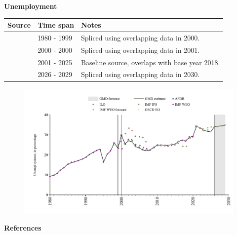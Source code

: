 \documentclass[12pt,a4paper,landscape]{article}
\begin{document}
\begin{adjustbox}{max totalsize={\paperwidth}{\paperheight},center}
\begin{minipage}[t][\textheight][t]{\textwidth}
\vspace*{0.5cm}
{}
\begin{center}
{\Large\bfseries Unemployment}
\end{center}
\vspace{0.5cm}
\begin{table}[H]
\centering
\small
\begin{tabular}{|l|l|l|}
\hline
\textbf{Source} & \textbf{Time span} & \textbf{Notes} \\
\hline
\rowcolor{white}\cite{IMF_WEO}& 1980 - 1999 &Spliced using overlapping data in 2000. \\
\rowcolor{lightgray}\cite{ILO}& 2000 - 2000 &Spliced using overlapping data in 2001. \\
\rowcolor{white}\cite{OECD_EO}& 2001 - 2025 &Baseline source, overlaps with base year 2018. \\
\rowcolor{lightgray}\cite{IMF_WEO_forecast}& 2026 - 2029 &Spliced using overlapping data in 2030. \\
\hline
\end{tabular}
\end{table}
\begin{figure}[H]
\centering
\includegraphics[width=\textwidth,height=0.6\textheight,keepaspectratio]{graphs/ZAF_unemp.pdf}
\end{figure}
\end{minipage}
\end{adjustbox}
{}
\begin{center}
{\Large\bfseries References}
\end{center}
\small


\end{document}
